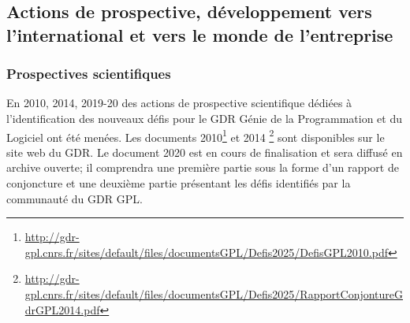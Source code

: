 \documentclass[11pt]{article}
\begin{document}





\subsection{Actions de prospective, développement vers l'international  et vers le monde de l'entreprise}


\subsubsection{Prospectives scientifiques}
En 2010, 2014, 2019-20 des actions de prospective scientifique dédiées à
l'identification des nouveaux défis pour le GDR Génie de la Programmation et du
Logiciel ont été menées. Les documents 2010\footnote{\url{http://gdr-gpl.cnrs.fr/sites/default/files/documentsGPL/Defis2025/DefisGPL2010.pdf}} et 2014 \footnote{\url{http://gdr-gpl.cnrs.fr/sites/default/files/documentsGPL/Defis2025/RapportConjontureGdrGPL2014.pdf}} sont disponibles sur le site web du GDR.
Le document 2020 est en cours de finalisation et sera
diffusé en archive ouverte; il comprendra une première partie sous la forme d'un rapport	de	conjoncture et une deuxième partie présentant les défis identifiés par la communauté du GDR GPL. \\
\end{document}
